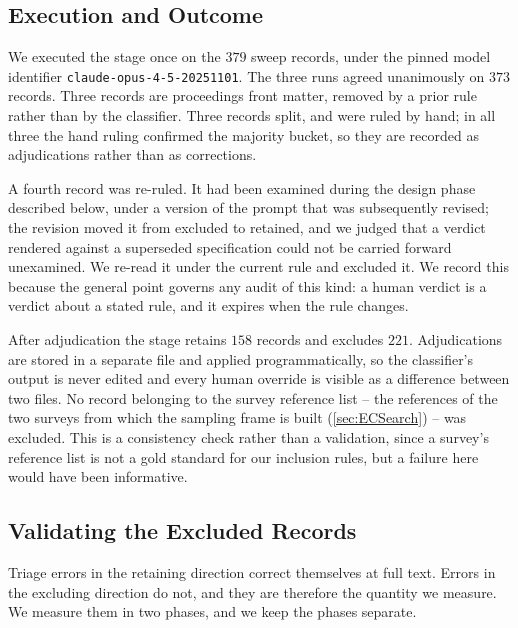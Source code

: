 \subsection{Execution and Outcome}

We executed the stage once on the \(379\) sweep records, under the pinned model identifier
\texttt{claude-opus-4-5-20251101}. The three runs agreed unanimously on \(373\) records. Three
records are proceedings front matter, removed by a prior rule rather than by the classifier. Three
records split, and were ruled by hand; in all three the hand ruling confirmed the majority bucket, so
they are recorded as adjudications rather than as corrections.

A fourth record was re-ruled. It had been examined during the design phase described below, under a
version of the prompt that was subsequently revised; the revision moved it from excluded to retained,
and we judged that a verdict rendered against a superseded specification could not be carried
forward unexamined. We re-read it under the current rule and excluded it. We record this because the
general point governs any audit of this kind: a human verdict is a verdict about a stated rule, and
it expires when the rule changes.

After adjudication the stage retains \(158\) records and excludes \(221\). Adjudications are stored
in a separate file and applied programmatically, so the classifier's output is never edited and every
human override is visible as a difference between two files. No record belonging to the survey reference list --
the references of the two surveys from which the sampling frame is built (\cref{sec:ECSearch}) -- was
excluded. This is a consistency check rather than a validation, since a survey's reference list is
not a gold standard for our inclusion rules, but a failure here would have been informative.

\subsection{Validating the Excluded Records}

Triage errors in the retaining direction correct themselves at full text. Errors in the excluding
direction do not, and they are therefore the quantity we measure. We measure them in two phases, and
we keep the phases separate.

